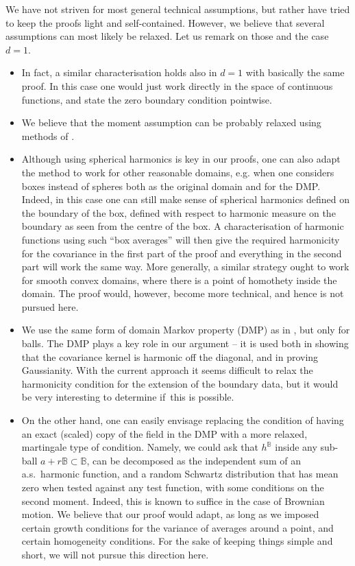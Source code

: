 \documentclass[10pt]{amsart}
\theoremstyle{definition}
\newcommand{\B}{\mathbb{B}}\let\D\B\let\Ub\B
\begin{document}
We have not striven for most general technical assumptions, but rather have tried to keep the proofs light and self-contained. However, we believe that several assumptions can most likely be relaxed. Let us remark on those and the case $d = 1$.\vspace*{-.3\baselineskip}\enlargethispage{\baselineskip}%

\begin{itemize}
\item In fact, a similar characterisation holds also in $d = 1$ with basically the same proof. In this case one would just work directly in the space of continuous functions, and state the zero boundary condition pointwise.
\item We believe that the moment assumption can be probably relaxed using methods of \cite{BPR20}.
\item Although using spherical harmonics is key in our proofs, one can also adapt the method to work for other reasonable domains, e.g. when one considers boxes instead of spheres both as the original domain and for the DMP. Indeed, in this case one can still make sense of spherical harmonics defined on the boundary of the box, defined with respect to harmonic measure on the boundary as seen from the centre of the box. A characterisation of harmonic functions using such ``box averages'' will then give the required harmonicity for the covariance in the first part of the proof and everything in the second part will work the same way. More generally, a similar strategy ought to work for smooth convex domains, where there is a point of homothety inside the domain. The proof would, however, become more technical, and hence is not pursued here.
\item We use the same form of domain Markov property (DMP) as in \cite{BPR18}, but only for balls. The DMP plays a key role in our argument -- it is used both in showing that the covariance kernel is harmonic off the diagonal, and in proving Gaussianity. With the current approach it seems difficult to relax the harmonicity condition for the extension of the boundary data, but it would be very interesting to determine if~this is possible.
\item On the other hand, one can easily envisage replacing the condition of having an exact (scaled) copy of the field in the DMP with a more relaxed, martingale type of condition. Namely, we could ask that $h^{\B}$ inside any sub-ball $a+r\B\subset \B$, can be decomposed as the independent sum of an a.s.\ harmonic function, and a random Schwartz distribution that has mean zero when tested against any test function, with some conditions on the second moment. Indeed, this is known to suffice in the case of Brownian motion. We believe that our proof would adapt, as long as we imposed certain growth conditions for the variance of averages around a point, and certain homogeneity conditions. For the sake of keeping things simple and short, we will not pursue this direction here.

\end{itemize}
\end{document}
